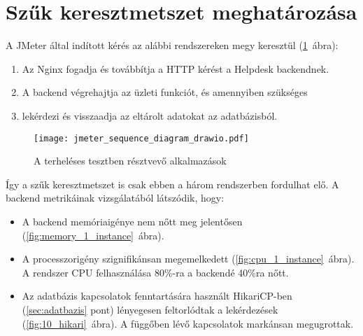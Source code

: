 \pagebreak

\section{Szűk keresztmetszet meghatározása}\label{sec:bottleneck}
A JMeter által indított kérés az alábbi rendszereken megy keresztül (\ref{fig:jmeter_sequence}~ábra):
\begin{enumerate}
	\item Az Nginx fogadja és továbbítja a HTTP kérést a Helpdesk backendnek.
	\item A backend végrehajtja az üzleti funkciót, és amennyiben szükséges
	\item lekérdezi és visszaadja az eltárolt adatokat az adatbázisból. 
\end{enumerate}

\begin{figure}[hbt] 
	\centering
	\texttt{[image: jmeter\_sequence\_diagram\_drawio.pdf]}
	\caption{A terheléses tesztben résztvevő alkalmazások}
	\label{fig:jmeter_sequence}
\end{figure}



Így a szűk keresztmetszet is csak ebben a három rendszerben fordulhat elő. A backend metrikáinak vizsgálatából látszódik, hogy:
\begin{itemize}
	\item A backend memóriaigénye nem nőtt meg jelentősen (\ref{fig:memory_1_instance}~ábra).
	
	\item A processzorigény szignifikánsan megemelkedett (\ref{fig:cpu_1_instance}~ábra). A rendszer CPU felhasználása 80\%-ra a backendé 40\%ra nőtt.
	
	\item Az adatbázis kapcsolatok fenntartására használt HikariCP-ben (\ref{sec:adatbazis} pont) lényegesen feltorlódtak a lekérdezések (\ref{fig:10_hikari}~ábra). A függőben lévő kapcsolatok markánsan megugrottak.
\end{itemize}


